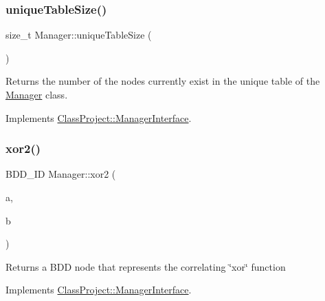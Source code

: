 \subsubsection{\texorpdfstring{unique\+Table\+Size()}{uniqueTableSize()}}
{\footnotesize\ttfamily size\+\_\+t Manager\+::unique\+Table\+Size (\begin{DoxyParamCaption}{ }\end{DoxyParamCaption})\hspace{0.3cm}{\ttfamily [virtual]}}

\begin{DoxyReturn}{Returns}
the number of the nodes currently exist in the unique table of the \hyperlink{classClassProject_1_1Manager}{Manager} class. 
\end{DoxyReturn}


Implements \hyperlink{classClassProject_1_1ManagerInterface_a85cac80444b26e5b80eb96b9f1231c0e}{Class\+Project\+::\+Manager\+Interface}.

\mbox{\label{classClassProject_1_1Manager_a2582e9a9474189a2710c551548c20c19}} 
\subsubsection{\texorpdfstring{xor2()}{xor2()}}
{\footnotesize\ttfamily B\+D\+D\+\_\+\+ID Manager\+::xor2 (\begin{DoxyParamCaption}\item[{const B\+D\+D\+\_\+\+ID}]{a,  }\item[{const B\+D\+D\+\_\+\+ID}]{b }\end{DoxyParamCaption})\hspace{0.3cm}{\ttfamily [virtual]}}

\begin{DoxyReturn}{Returns}
a B\+DD node that represents the correlating \char`\"{}xor\char`\"{} function 
\end{DoxyReturn}


Implements \hyperlink{classClassProject_1_1ManagerInterface_a2b2c4948ef41ddb1036289cd07dac156}{Class\+Project\+::\+Manager\+Interface}.

